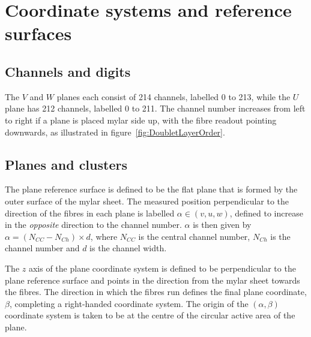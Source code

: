 \section{Coordinate systems and reference surfaces}
\label{sec:Coordinates}

  \subsection{Channels and digits}
  The $V$ and $W$ planes each consist of 214 channels, labelled 0 to 213, while the $U$ plane has 212 channels, labelled 0 to 211.  The channel number increases from left to right if a plane is placed mylar side up, with the fibre readout pointing downwards, as illustrated in figure~\ref{fig:DoubletLayerOrder}.

  \subsection{Planes and clusters}
  \label{subsec:PlaneAndClusters}
  The plane reference surface is defined to be the flat plane that is formed by the outer surface of the mylar sheet. The measured position perpendicular to the direction of the fibres in each plane is labelled  $\alpha \in (v, u, w)$, defined to increase in the \textit{opposite} direction to the channel number. $\alpha$ is then given by $\alpha = \left(N_{CC} - N_{Ch}\right) \times d$, where $N_{CC}$ is the central channel number, $N_{Ch}$ is the channel number and $d$ is the channel width.
  
% 
  
  The $z$ axis of the plane coordinate system is defined to be perpendicular to the plane reference surface and points in the direction from the mylar sheet towards the fibres. The direction in which the fibres run defines the final plane coordinate, $\beta$, completing a right-handed coordinate system. The origin of the $(\alpha, \beta)$ coordinate system is taken to be at the centre of the circular active area of the plane.

